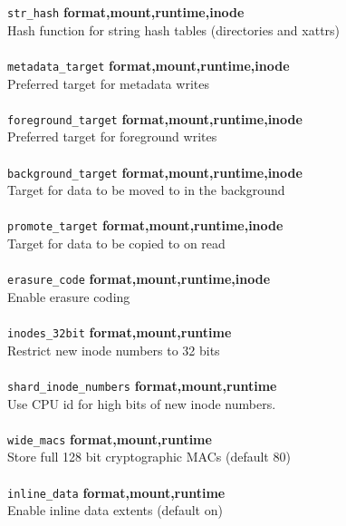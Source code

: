 \documentclass{article}
\begin{document}
\begin{tabbing}
	\texttt{str\_hash}		\` \textbf{format,mount,runtime,inode}	\\
	\> Hash function for string hash tables (directories and xattrs)	\\ \\

	\texttt{metadata\_target}	\` \textbf{format,mount,runtime,inode}	\\
	\> Preferred target for metadata writes					\\ \\

	\texttt{foreground\_target}	\` \textbf{format,mount,runtime,inode}	\\
	\> Preferred target for foreground writes				\\ \\

	\texttt{background\_target}	\` \textbf{format,mount,runtime,inode}	\\
	\> Target for data to be moved to in the background			\\ \\

	\texttt{promote\_target}	\` \textbf{format,mount,runtime,inode}	\\
	\> Target for data to be copied to on read				\\ \\

	\texttt{erasure\_code}		\` \textbf{format,mount,runtime,inode}	\\
	\> Enable erasure coding						\\ \\

	\texttt{inodes\_32bit}		\` \textbf{format,mount,runtime}	\\
	\> Restrict new inode numbers to 32 bits				\\ \\

	\texttt{shard\_inode\_numbers}	\` \textbf{format,mount,runtime}	\\
	\> Use CPU id for high bits of new inode numbers. 			\\ \\

	\texttt{wide\_macs}		\` \textbf{format,mount,runtime}	\\
	\> Store full 128 bit cryptographic MACs (default 80)			\\ \\

	\texttt{inline\_data}		\` \textbf{format,mount,runtime}	\\
	\> Enable inline data extents (default on)				\\ \\


\end{tabbing}
\end{document}
